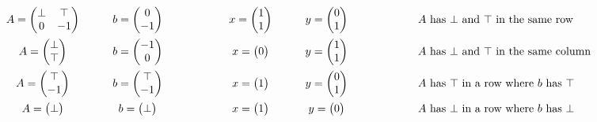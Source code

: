 \documentclass[]{article}
\renewcommand{\.}{\hskip .75pt}
\begin{document}
$$
\begin{array}{c@{\hspace{30pt}}c@{\hspace{60pt}}c@{\hspace{30pt}}c@{\hspace{60pt}}l}
A =
\begin{pmatrix}
	\bot & \top \\
	0 & -1
\end{pmatrix}
&
b = \begin{pmatrix} 0 \\ -1 \end{pmatrix}
&
x = \begin{pmatrix} 1 \\ 1 \end{pmatrix}
&
y = \begin{pmatrix} 0 \\ 1 \end{pmatrix}
&
\mbox{ $A$ has $\bot$ and $\top$ in the same row}
%
\vspace{5pt} \\
%
A = \begin{pmatrix} \bot \\ \top \end{pmatrix}
&
b = \begin{pmatrix} -1 \\ 0 \end{pmatrix}
&
x = \begin{pmatrix} 0 \end{pmatrix}
&
y = \begin{pmatrix} 1 \\ 1 \end{pmatrix}
&
\mbox{ $A$ has $\bot$ and $\top$ in the same column}
%
\vspace{5pt} \\
%
A = \begin{pmatrix} \top \\ -1 \end{pmatrix}
&
b = \begin{pmatrix} \top \\ -1 \end{pmatrix}
&
x = \begin{pmatrix} 1 \end{pmatrix}
&
y = \begin{pmatrix} 0 \\ 1 \end{pmatrix}
&
\mbox{ $A$ has $\top$ in a row where $b$ has $\top$}
%
\vspace{5pt} \\
%
A = \begin{pmatrix} \bot \end{pmatrix}
&
b = \begin{pmatrix} \bot \end{pmatrix}
&
x = \begin{pmatrix} 1 \end{pmatrix}
&
y = \begin{pmatrix} 0 \end{pmatrix}
&
\mbox{ $A$ has $\bot$ in a row where $b$ has $\bot$}
\end{array}
$$
\end{document}
